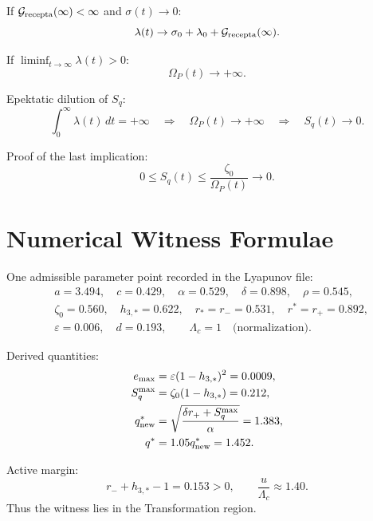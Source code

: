 \documentclass[11pt,a4paper]{article}
\newcommand{\Grec}{\mathcal G_{\rm recepta}}
\newcommand{\Sq}{S_q}
\newcommand{\Om}{\Omega_P}
\theoremstyle{remark}
\begin{document}
If $\Grec(\infty)<\infty$ and $\sigma(t)\to0$:
\begin{equation}
  \lambda(t)\to \sigma_0+\lambda_0+\Grec(\infty).
\end{equation}

If $\liminf_{t\to\infty}\lambda(t)>0$:
\begin{equation}
  \Om(t)\to+\infty.
\end{equation}

Epektatic dilution of $S_q$:
\begin{equation}
  \int_0^\infty\lambda(t)\,dt=+\infty
  \quad\Longrightarrow\quad
  \Om(t)\to+\infty
  \quad\Longrightarrow\quad
  S_q(t)\to0.
\end{equation}

Proof of the last implication:
\begin{equation}
  0\le S_q(t)\le\frac{\zeta_0}{\Om(t)}\to0.
\end{equation}


\section{Numerical Witness Formulae}\label{sec:witness}

One admissible parameter point recorded in the Lyapunov file:
\begin{equation}
\begin{aligned}
&a=3.494,\quad c=0.429,\quad \alpha=0.529,\quad \delta=0.898,\quad \rho=0.545,\\
&\zeta_0=0.560,\quad h_{3,*}=0.622,\quad r_*=r_-=0.531,\quad r^*=r_+=0.892,\\
&\varepsilon=0.006,\quad d=0.193,\qquad \Lambda_c=1\quad\text{(normalization)}.
\end{aligned}
\end{equation}

Derived quantities:
\begin{equation}
\begin{aligned}
  e_{\max}&=\varepsilon(1-h_{3,*})^2=0.0009,\\
  \Sq^{\max}&=\zeta_0(1-h_{3,*})=0.212,\\
  q_{\rm new}^*&=\sqrt{\frac{\delta r_++\Sq^{\max}}{\alpha}}=1.383,\\
  q^*&=1.05q_{\rm new}^*=1.452.
\end{aligned}
\end{equation}

Active margin:
\begin{equation}
  r_-+h_{3,*}-1=0.153>0,
  \qquad
  \frac{u}{\Lambda_c}\approx1.40.
\end{equation}
Thus the witness lies in the Transformation region.
\end{document}

